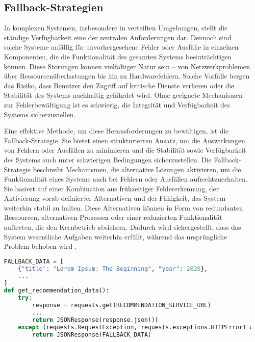 \subsection{Fallback-Strategien}
In komplexen Systemen, insbesondere in verteilten Umgebungen, stellt die ständige Verfügbarkeit eine der zentralen Anforderungen dar.
Dennoch sind solche Systeme anfällig für unvorhergesehene Fehler oder Ausfälle in einzelnen Komponenten,
die die Funktionalität des gesamten Systems beeinträchtigen können.
Diese Störungen können vielfältiger Natur sein – von Netzwerkproblemen über Ressourcenüberlastungen bis hin zu Hardwarefehlern.
Solche Vorfälle bergen das Risiko, dass Benutzer den Zugriff auf kritische Dienste verlieren oder die Stabilität des
Systems nachhaltig gefährdet wird.
Ohne geeignete Mechanismen zur Fehlerbewältigung ist es schwierig, die Integrität und Verfügbarkeit des Systems sicherzustellen.

Eine effektive Methode, um diese Herausforderungen zu bewältigen, ist die Fallback-Strategie.
Sie bietet einen strukturierten Ansatz, um die Auswirkungen von Fehlern oder Ausfällen zu minimieren und die Stabilität
sowie Verfügbarkeit des Systems auch unter schwierigen Bedingungen sicherzustellen.
Die Fallback-Strategie beschreibt Mechanismen, die alternative Lösungen aktivieren, um die Funktionalität eines Systems
auch bei Fehlern oder Ausfällen aufrechtzuerhalten.
Sie basiert auf einer Kombination aus frühzeitiger Fehlererkennung, der Aktivierung vorab definierter Alternativen und
der Fähigkeit, das System weiterhin stabil zu halten.
Diese Alternativen können in Form von redundanten Ressourcen, alternativen Prozessen oder einer reduzierten
Funktionalität auftreten, die den Kernbetrieb absichern.
Dadurch wird sichergestellt, dass das System wesentliche Aufgaben weiterhin erfüllt,
während das ursprüngliche Problem behoben wird \cite{fallback-strategy}.

\begin{lstlisting}[language=Python, caption=Fallback-Pattern in Python, float=htb, label=lst:python]
FALLBACK_DATA = [
    {"title": "Lorem Ipsum: The Beginning", "year": 2020},
    ...
]
def get_recommendation_data():
    try:
        response = requests.get(RECOMMENDATION_SERVICE_URL)
        ...
        return JSONResponse(response.json())
    except (requests.RequestException, requests.exceptions.HTTPError) as e:
        return JSONResponse(FALLBACK_DATA)
\end{lstlisting}

